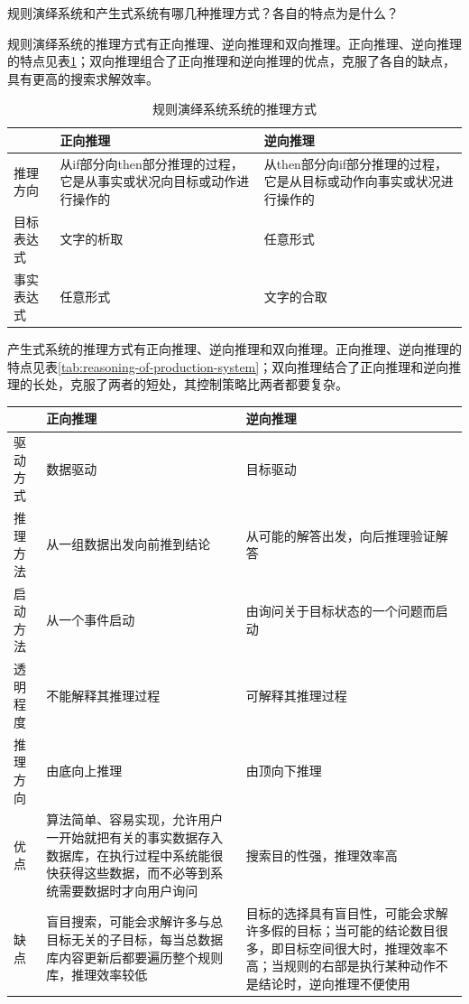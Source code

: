 \begin{question}
规则演绎系统和产生式系统有哪几种推理方式？各自的特点为是什么？
\end{question}
\begin{solution}
规则演绎系统的推理方式有正向推理、逆向推理和双向推理。正向推理、逆向推理的特点见表\ref{tab:reasoning-of-rule-based-system}；双向推理组合了正向推理和逆向推理的优点，克服了各自的缺点，具有更高的搜索求解效率。
	\begin{table}[htbp]
	\centering
	\begin{tabular}{p{80pt}p{110pt}p{110pt}}
		\toprule
		~ & 正向推理 & 逆向推理 \\
		\midrule
		推理方向 & 从if部分向then部分推理的过程，它是从事实或状况向目标或动作进行操作的 & 从then部分向if部分推理的过程，它是从目标或动作向事实或状况进行操作的 \\
		\midrule
		目标表达式 & 文字的析取 & 任意形式 \\
		\midrule
		事实表达式 & 任意形式 & 文字的合取 \\
		\bottomrule
	\end{tabular}
	\caption{规则演绎系统系统的推理方式}\label{tab:reasoning-of-rule-based-system}
	\end{table} 
	\par
产生式系统的推理方式有正向推理、逆向推理和双向推理。正向推理、逆向推理的特点见表\ref{tab:reasoning-of-production-system}；双向推理结合了正向推理和逆向推理的长处，克服了两者的短处，其控制策略比两者都要复杂。
	\begin{table}[htbp]
	\centering
	\begin{tabular}{p{80pt}p{110pt}p{110pt}}
		\toprule
		~ & 正向推理 & 逆向推理 \\
		\midrule
		驱动方式 & 数据驱动 & 目标驱动 \\ 
		\midrule
		推理方法 & 从一组数据出发向前推到结论 & 从可能的解答出发，向后推理验证解答 \\ 
		\midrule
		启动方法 & 从一个事件启动 & 由询问关于目标状态的一个问题而启动 \\ 
		\midrule
		透明程度 & 不能解释其推理过程 & 可解释其推理过程 \\ 
		\midrule
		推理方向 & 由底向上推理 & 由顶向下推理 \\ 
		\midrule
		优点 & 算法简单、容易实现，允许用户一开始就把有关的事实数据存入数据库，在执行过程中系统能很快获得这些数据，而不必等到系统需要数据时才向用户询问 & 搜索目的性强，推理效率高 \\ 
		\midrule
		缺点 & 盲目搜索，可能会求解许多与总目标无关的子目标，每当总数据库内容更新后都要遍历整个规则库，推理效率较低 & 目标的选择具有盲目性，可能会求解许多假的目标；当可能的结论数目很多，即目标空间很大时，推理效率不高；当规则的右部是执行某种动作不是结论时，逆向推理不便使用 \\ 

\end{tabular}
\end{table}
\end{solution}

